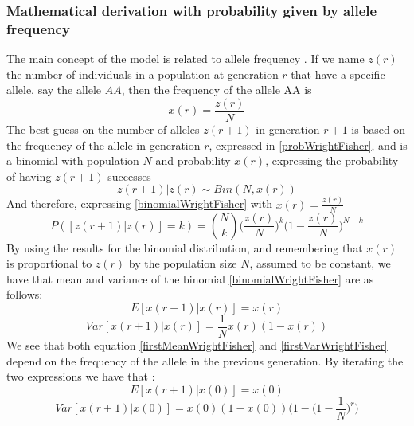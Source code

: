 \documentclass[12pt,mythesisstyle]{report}
\begin{document}
\subsubsection{Mathematical derivation with probability given by allele frequency \cite{wrightexplained}}
The main concept of the model is related to allele frequency \cite{wrightexplained}. If we name $z(r)$
 the number of individuals in a population at generation $r$ that have a specific allele, say the allele $AA$, then the frequency of the allele AA is
 \begin{equation}\label{probWrightFisher}
 x(r)=\frac{z(r)}{N}
 \end{equation}
The best guess on the number of alleles $z(r+1)$ in generation $r+1$ is based on the frequency of the allele in generation $r$, expressed in \eqref{probWrightFisher}, and is a binomial with population $N$ and probability $x(r)$, expressing the probability of having $z(r+1)$ successes
\begin{equation}\label{binomialWrightFisher}
z(r+1)|z(r) \sim Bin(N,x(r))
\end{equation}
And therefore, expressing \eqref{binomialWrightFisher} with $x(r)=\frac{z(r)}{N}$
\begin{equation}\label{binomialWrightFisherFull}
P([z(r+1)|z(r)]=k)=\binom{N}{k}\bigg(\frac{z(r)}{N}\bigg)^k\bigg(1-\frac{z(r)}{N}\bigg)^{N-k}
\end{equation}
By using the results for the binomial distribution, and remembering that $x(r)$ is proportional to $z(r)$ by the population size $N$, assumed to be constant, we have that mean and variance of the binomial \eqref{binomialWrightFisher} are as follows:
\begin{equation}\label{firstMeanWrightFisher}
E[x(r+1)|x(r)]=x(r)
\end{equation}
\begin{equation}\label{firstVarWrightFisher}
Var[x(r+1)|x(r)]=\frac{1}{N}x(r)(1-x(r))
\end{equation}
We see that both equation \eqref{firstMeanWrightFisher} and \eqref{firstVarWrightFisher} depend on the frequency of the allele in the previous generation. By iterating the two expressions we have that \cite{wrightexplained}:
\begin{equation}\label{meanWrightFisher}
E[x(r+1)|x(0)]=x(0)
\end{equation}
\begin{equation}\label{varWrightFisher}
Var[x(r+1)|x(0)]=x(0)(1-x(0))\bigg(1-\bigg(1-\frac{1}{N}\bigg)^r\bigg)
\end{equation}
\end{document}
